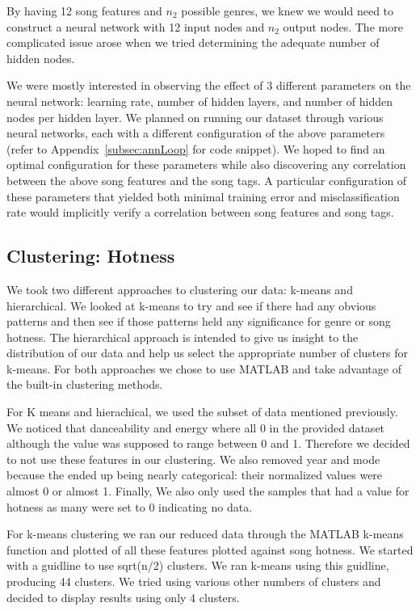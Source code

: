 \documentclass[12pt]{article}
\begin{document}
By having 12 song features and $n_2$ possible genres, we knew we would need to construct a neural network with 12 input nodes and $n_2$ output nodes. The more complicated issue arose when we tried determining the adequate number of hidden nodes.

We were mostly interested in observing the effect of 3 different parameters on the neural network: learning rate, number of hidden layers, and number of hidden nodes per hidden layer. We planned on running our dataset through various neural networks, each with a different configuration of the above parameters (refer to Appendix~\ref{subsec:annLoop} for code snippet). We hoped to find an optimal configuration for these parameters while also discovering any correlation between the above song features and the song tags. A particular configuration of these parameters that yielded both minimal training error and misclassification rate would implicitly verify a correlation between song features and song tags.

\subsection{Clustering: Hotness}
\label{subsec:clustering}
We took two different approaches to clustering our data: k-means and hierarchical. We looked at k-means to try and see if there had any obvious patterns and then see if those patterns held any significance for genre or song hotness. The hierarchical approach is intended to give us insight to the distribution of our data and help us select the appropriate number of clusters for k-means. For both approaches we chose to use MATLAB and take advantage of the built-in clustering methods.

For K means and hierachical, we used the subset of data mentioned previously. We noticed that danceability and energy where all 0 in the provided dataset although the value was supposed to range between 0 and 1. Therefore we decided to not use these features in our clustering. We also removed year and mode because the ended up being nearly categorical: their normalized values were almost 0 or almost 1. Finally, We also only used the samples that had a value for hotness as many were set to 0 indicating no data. 

For k-means clustering we ran our reduced data through the MATLAB k-means function and plotted of all these features plotted against song hotness. We started with a guidline to use sqrt(n/2) clusters. We ran k-means using this guidline, producing 44 clusters. We tried using various other numbers of clusters and decided to display results using only 4 clusters.
\end{document}
